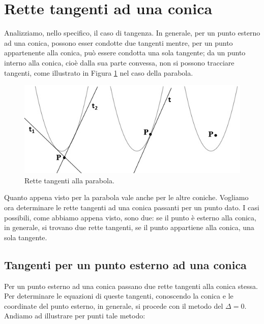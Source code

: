 \section{Rette tangenti ad una conica}
\label{sec:coniche_tangenti}

Analizziamo, nello specifico, il caso di tangenza. In generale, per un 
punto esterno ad una conica, possono esser condotte due tangenti mentre, per 
un punto appartenente alla conica, può essere condotta una sola tangente;  
da un punto interno alla conica, cioè dalla sua parte convessa, non si 
possono tracciare tangenti, come illustrato in Figura \ref{fig:ellissedalcono} nel caso della 
parabola. 

\begin{figure}[t]
  \centering
  \includegraphics[scale=0.8]{img/tangenti2.jpg}
  \caption{Rette tangenti alla parabola.}%
  \label{fig:ellissedalcono}
\end{figure}

Quanto appena visto per la parabola vale anche per le altre coniche.
Vogliamo ora determinare le rette tangenti ad una conica passanti per un 
punto dato. I casi possibili, come abbiamo appena visto, sono due: se il 
punto è esterno alla conica, in generale, si trovano due rette tangenti, se 
il punto appartiene alla conica, una sola tangente.

\subsection{Tangenti per un punto esterno ad una conica}

Per un punto esterno ad una conica passano due rette tangenti alla conica 
stessa. Per determinare le equazioni di queste tangenti, conoscendo la 
conica e le coordinate del punto esterno, in generale, si procede con il 
metodo del $ \Delta =0$. Andiamo ad illustrare per punti tale metodo:

